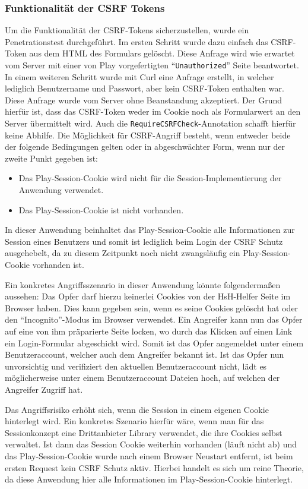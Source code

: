 \documentclass[12pt,DIV14,BCOR10mm,a4paper,parskip=half-,headsepline,headinclude,english,ngerman,bibliography=totocnumbered]{scrreprt}
\begin{document}
\subsubsection{Funktionalität der CSRF Tokens}
Um die Funktionalität der CSRF-Tokens sicherzustellen, wurde ein Penetrationstest durchgeführt. Im ersten Schritt wurde dazu einfach das CSRF-Token aus dem HTML des Formulars gelöscht. Diese Anfrage wird wie erwartet vom Server mit einer von Play vorgefertigten \enquote{\texttt{Unauthorized}} Seite beantwortet. In einem weiteren Schritt wurde mit Curl eine Anfrage erstellt, in welcher lediglich Benutzername und Passwort, aber kein CSRF-Token enthalten war. Diese Anfrage wurde vom Server ohne Beanstandung akzeptiert. Der Grund hierfür ist, dass das CSRF-Token weder im Cookie noch als Formularwert an den Server übermittelt wird. Auch die \texttt{RequireCSRFCheck}-Annotation schafft hierfür keine Abhilfe. Die Möglichkeit für CSRF-Angriff besteht, wenn entweder beide der folgende Bedingungen gelten oder in abgeschwächter Form, wenn nur der zweite Punkt gegeben ist:

  \begin{itemize}
    \item Das Play-Session-Cookie wird nicht für die Session-Implementierung der Anwendung verwendet.
    \item Das Play-Session-Cookie ist nicht vorhanden.
  \end{itemize}

In dieser Anwendung beinhaltet das Play-Session-Cookie alle Informationen zur Session eines Benutzers und somit ist lediglich beim Login der CSRF Schutz ausgehebelt, da zu diesem Zeitpunkt noch nicht zwangsläufig ein Play-Session-Cookie vorhanden ist.

Ein konkretes Angriffsszenario in dieser Anwendung könnte folgendermaßen aussehen: Das Opfer darf hierzu keinerlei Cookies von der HsH-Helfer Seite im Browser haben. Dies kann gegeben sein, wenn es seine Cookies gelöscht hat oder den \enquote{Incognito}-Modus im Browser verwendet. Ein Angreifer kann nun das Opfer auf eine von ihm präparierte Seite locken, wo durch das Klicken auf einen Link ein Login-Formular abgeschickt wird. Somit ist das Opfer angemeldet unter einem Benutzeraccount, welcher auch dem Angreifer bekannt ist. Ist das Opfer nun unvorsichtig und verifiziert den aktuellen Benutzeraccount nicht, lädt es möglicherweise unter einem Benutzeraccount Dateien hoch, auf welchen der Angreifer Zugriff hat.

Das Angriffsrisiko erhöht sich, wenn die Session in einem eigenen Cookie hinterlegt wird. Ein konkretes Szenario hierfür wäre, wenn man für das Sessionkonzept eine Drittanbieter Library verwendet, die ihre Cookies selbst verwaltet. Ist dann das Session Cookie weiterhin vorhanden (läuft nicht ab) und das Play-Session-Cookie wurde nach einem Browser Neustart entfernt, ist beim ersten Request kein CSRF Schutz aktiv. Hierbei handelt es sich um reine Theorie, da diese Anwendung hier alle Informationen im Play-Session-Cookie hinterlegt.
\end{document}
